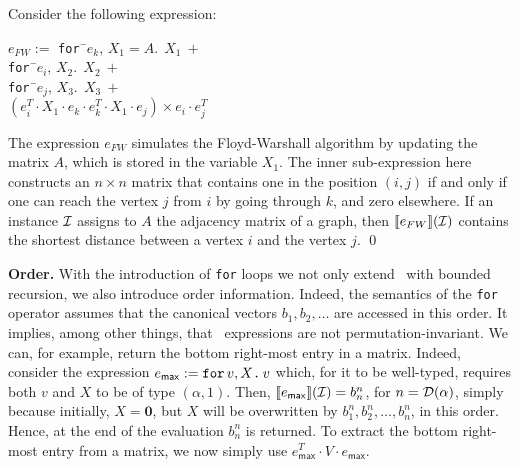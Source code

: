 \begin{example}\label{ex:floyd}
Consider the following expression:
\begin{tabbing}
$e_{FW} := $ \texttt{for\,}\=$e_k,\, X_1\!=\!A.\ \ X_1 \ + $\\
\> \texttt{for\,}\=$e_i, \, X_2.\ \ X_2 \ +$ \\
\>\>\texttt{for\,}\=$e_j,\, X_3.\ \ X_3 \ +$ \\
\>\>\>$(e_i^T\cdot X_1\cdot e_k \cdot e_k^T\cdot X_1\cdot e_j)\times e_i\cdot e_j^T$
\end{tabbing}
The expression $e_{FW}$ simulates the Floyd-Warshall algorithm by updating the matrix $A$, which is stored in the variable $X_1$. The inner sub-expression here constructs an $n\times n$ matrix that contains one in the position $(i,j)$ if and only if one can reach the vertex $j$ from $i$ by going through $k$, and zero elsewhere. If an instance $\mathcal{I}$ assigns to $A$ the adjacency matrix of a graph, then $\llbracket e_{FW} \rrbracket(\mathcal{I})$ contains the shortest distance between a vertex $i$ and the vertex $j$.
\qed
\end{example}


\noindent\textbf{Order.} With the introduction of \texttt{for} loops we not only extend \lang\ with bounded recursion, we also introduce order information. Indeed, the semantics of the \texttt{for} operator assumes that the canonical vectors $b_1,b_2,\ldots$
are accessed in this order. It implies, among other things, that \langfor\ expressions are not permutation-invariant.
We can, for example, return the bottom right-most entry in a matrix. Indeed, consider the expression $e_{\mathsf{max}} := \texttt{for}\, v,X \texttt{.}\, v$ which, for it to be well-typed, requires both $v$ and $X$ to be of type $(\alpha,1)$. Then, $\llbracket e_{\mathsf{max}} \rrbracket(\mathcal{I})=b_n^n$, for $n=\mathcal{D}(\alpha)$, simply because initially, $X=\mathbf{0}$, but $X$ will be overwritten by $b_1^n,b_2^n,\ldots,b_n^n$, in this order. Hence, at the end of the evaluation $b_n^n$ is returned.
To extract the bottom right-most entry from a matrix, we now simply use $e_{\mathsf{max}}^T\cdot V\cdot e_{\mathsf{max}}$.

